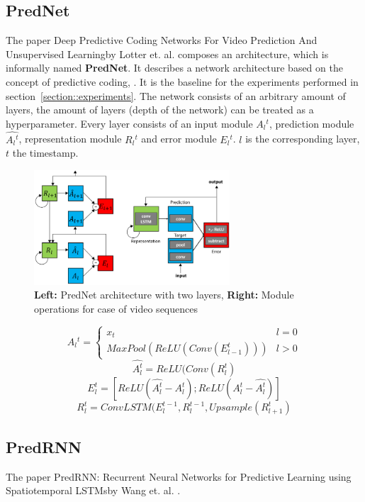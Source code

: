  \subsection{PredNet}
  The paper \glqq Deep Predictive Coding Networks For Video Prediction And Unsupervised Learning\grqq by Lotter et. al. \cite{Lotter2016} composes an architecture, which is informally named
  \textbf{PredNet}. It describes a network architecture based on the concept of \glqq predictive coding\grqq \cite{Rao1999}, \cite{Friston2005}. It is the baseline for the experiments performed
  in section~\ref{section::experiments}. The network consists of an arbitrary amount of layers, the amount of layers (depth of the network) can be treated as a hyperparameter. Every layer consists
  of an input module $A{_l}^t$, prediction module $\hat{A{_l}^t}$, representation module $R{_l}^t$ and error module $E{_l}^t$. $l$ is the corresponding layer, $t$ the timestamp.
  \begin{figure}[H]
   \includegraphics[width=0.65\textwidth]{../Images/lotter.png}
   \centering
   \caption{\textbf{Left:} PredNet architecture with two layers, \textbf{Right:} \glqq Module operations for case of video sequences\grqq \cite{Lotter2016}}
   \label{fig:lotter_architecture}
  \end{figure}
  \begin{equation}
   A{_l}^t = \begin{cases} x_t & l = 0 \\ MaxPool(ReLU(Conv(E_{l-1}^t))) & l > 0 \end{cases}
  \end{equation}
  \begin{equation}
   \hat{A_l^t} = ReLU(Conv(R_l^t)
  \end{equation}
  \begin{equation}
   E_l^t = [ReLU(\hat{A_l^t} - A_l^t); ReLU(A_l^t - \hat{A_l^t})]
  \end{equation}
  \begin{equation}
   R_l^t = ConvLSTM(E_l^{t-1}, R_l^{t-1}, Upsample(R_{l+1}^t)
  \end{equation}
 
 
 \subsection{PredRNN}
  The paper \glqq PredRNN: Recurrent Neural Networks for Predictive Learning using Spatiotemporal LSTMs\grqq by Wang et. al. \cite{Wang2017}.
  